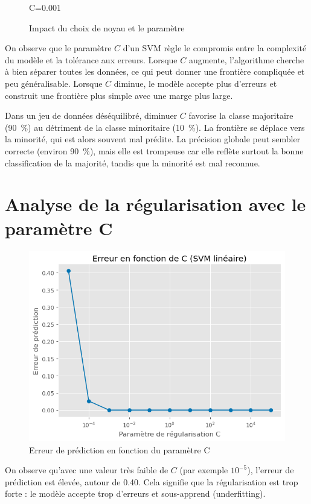 \documentclass{rapport}
\begin{document}
\begin{figure}[H]
\begin{minipage}{0.47\linewidth}
        \caption*{C=0.001}
    \end{minipage}\hfill
    \caption{Impact du choix de noyau et le paramètre}
    \label{fig:trois_images}
\end{figure}

On observe que le paramètre $C$ d’un SVM règle le compromis entre la complexité du modèle et la tolérance aux erreurs. 
Lorsque $C$ augmente, l’algorithme cherche à bien séparer toutes les données, ce qui peut donner une frontière compliquée et peu généralisable. 
Lorsque $C$ diminue, le modèle accepte plus d’erreurs et construit une frontière plus simple avec une marge plus large. 

Dans un jeu de données déséquilibré, diminuer $C$ favorise la classe majoritaire (90~\%) au détriment de la classe minoritaire (10~\%). 
La frontière se déplace vers la minorité, qui est alors souvent mal prédite. 
La précision globale peut sembler correcte (environ 90~\%), mais elle est trompeuse car elle reflète surtout la bonne classification de la majorité, tandis que la minorité est mal reconnue.




\section{Analyse de la régularisation avec le paramètre C}
\begin{figure}[H]
    \centering
    \includegraphics[width=0.75\linewidth]{output.png}
    \caption{Erreur de prédiction en fonction du paramètre C}
    \label{fig:placeholder}
\end{figure}


On observe qu’avec une valeur très faible de $C$ (par exemple $10^{-5}$), l’erreur de prédiction est élevée, autour de 0.40. Cela signifie que la régularisation est trop forte : le modèle accepte trop d’erreurs et sous-apprend (underfitting).
\end{document}
